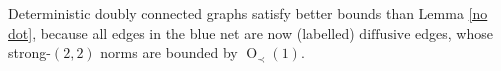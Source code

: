 \documentclass{article}
\newcommand{\1}{\mathds{1}}
\numberwithin{equation}{section}
\newcommand{\ord}{{\rm{ord}}}
\newcommand{\be}{\begin{equation}}
\newcommand{\ee}{\end{equation}}
\newcommand{\e}{{\varepsilon}}
\renewcommand{\cal}{\mathcal}
\renewcommand{\leq}{\leqslant}
\renewcommand{\geq}{\geqslant}
\renewcommand{\le}{\leq}
\renewcommand{\ge}{\geq}
\newcommand{\Z}{\mathbb{Z}}
\newcommand{\dashed}{\text{diffusive}}
\DeclareMathOperator{\OO}{O}
\theoremstyle{plain} %
\newtheorem{corollary}[theorem]{Corollary}
\theoremstyle{remark}
\begin{document}

Deterministic doubly connected graphs satisfy better bounds than Lemma \ref{no dot}, because all edges in the blue net are now (labelled) $\dashed$ edges, whose strong-$(2,2)$ norms are bounded by $\OO_\prec(1)$.%
 
 
\end{document}
